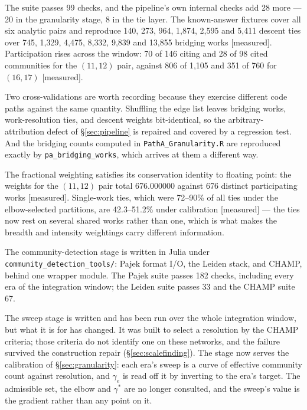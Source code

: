 \documentclass[11pt]{article}
\newcommand{\meas}{{\footnotesize\textsf{[measured]}}}
\newcommand{\code}[1]{\texttt{\small #1}}
\begin{document}
The suite passes 99 checks, and the pipeline's own internal checks add 28 more --- 20 in the
granularity stage, 8 in the tie layer. The known-answer fixtures cover all six analytic pairs
and reproduce 140, 273, 964, 1{,}874, 2{,}595 and 5{,}411 descent ties over 745, 1{,}329,
4{,}475, 8{,}332, 9{,}839 and 13{,}855 bridging works \meas{}. Participation rises across the
window: 70 of 146 citing and 28 of 98 cited communities for the $(11,12)$ pair, against 806 of
1{,}105 and 351 of 760 for $(16,17)$ \meas{}.

Two cross-validations are worth recording because they exercise different code paths against
the same quantity. Shuffling the edge list leaves bridging works, work-resolution ties, and
descent weights bit-identical, so the arbitrary-attribution defect of \S\ref{sec:pipeline} is
repaired and covered by a regression test. And the bridging counts computed in
\code{PathA\_Granularity.R} are reproduced exactly by \code{pa\_bridging\_works}, which
arrives at them a different way.

The fractional weighting satisfies its conservation identity to floating point: the weights
for the $(11,12)$ pair total 676.000000 against 676 distinct participating works \meas{}.
Single-work ties, which were 72--90\% of all ties under the elbow-selected partitions, are
42.3--51.2\% under calibration \meas{} --- the ties now rest on several shared works rather
than one, which is what makes the breadth and intensity weightings carry different
information.

The community-detection stage is written in Julia under
\code{community\_detection\_tools/}: Pajek format I/O, the Leiden stack, and CHAMP, behind
one wrapper module. The Pajek suite passes 182 checks, including every era of the integration
window; the Leiden suite passes 33 and the CHAMP suite 67.

The sweep stage is written and has been run over the whole integration window, but what it
is for has changed. It was built to select a resolution by the CHAMP criteria; those criteria
do not identify one on these networks, and the failure survived the construction repair
(\S\ref{sec:scalefinding}). The stage now serves the calibration of
\S\ref{sec:granularity}: each era's sweep is a curve of effective community count against
resolution, and $\gamma_e$ is read off it by inverting to the era's target. The admissible
set, the elbow and $\gamma^{*}$ are no longer consulted, and the sweep's value is the
gradient rather than any point on it.
\end{document}

